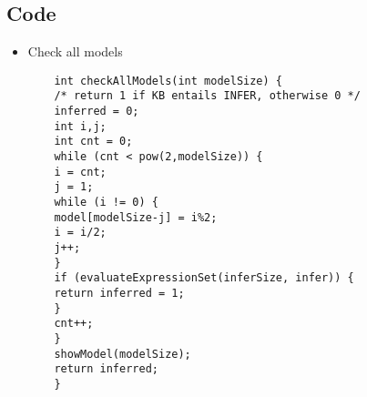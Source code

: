 \documentclass{article}
\begin{document}
	\subsection*{Code}
	\begin{itemize}
	\item Check all models
	\begin{lstlisting}
	int checkAllModels(int modelSize) {
	/* return 1 if KB entails INFER, otherwise 0 */
	inferred = 0;
	int i,j;
	int cnt = 0;
	while (cnt < pow(2,modelSize)) {
	i = cnt;
	j = 1;
	while (i != 0) {
	model[modelSize-j] = i%2;
	i = i/2;
	j++;
	}
	if (evaluateExpressionSet(inferSize, infer)) {
	return inferred = 1;
	}
	cnt++;
	}
	showModel(modelSize);
	return inferred;
	}
	\end{lstlisting}
	
	
	\end{itemize}
		
\end{document}
